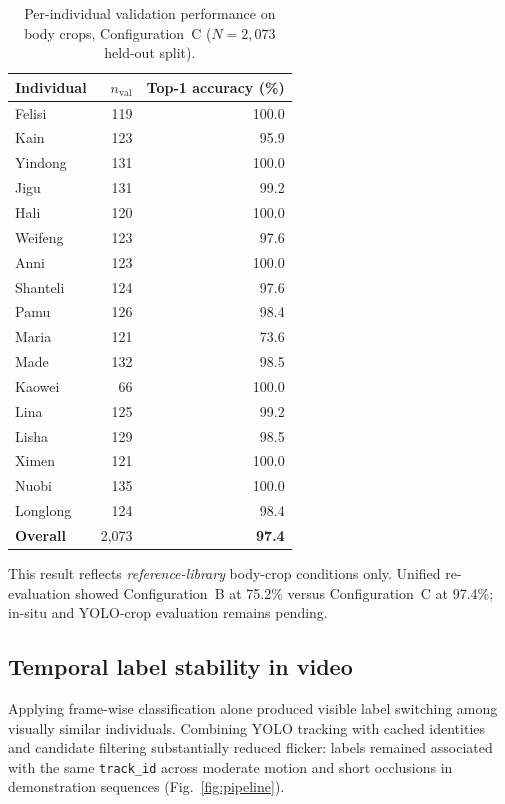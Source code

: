 \documentclass[preprint,12pt,3p,times]{elsarticle}
\begin{document}
\begin{table}[t]
  \centering
  \caption{Per-individual validation performance on body crops, Configuration~C ($N{=}2{,}073$ held-out split).}
  \label{tab:placeholder}
  \begin{tabular}{@{}lrr@{}}
    \toprule
    Individual & $n_{\mathrm{val}}$ & Top-1 accuracy (\%) \\
    \midrule
    Felisi & 119 & 100.0 \\
    Kain & 123 & 95.9 \\
    Yindong & 131 & 100.0 \\
    Jigu & 131 & 99.2 \\
    Hali & 120 & 100.0 \\
    Weifeng & 123 & 97.6 \\
    Anni & 123 & 100.0 \\
    Shanteli & 124 & 97.6 \\
    Pamu & 126 & 98.4 \\
    Maria & 121 & 73.6 \\
    Made & 132 & 98.5 \\
    Kaowei & 66 & 100.0 \\
    Lina & 125 & 99.2 \\
    Lisha & 129 & 98.5 \\
    Ximen & 121 & 100.0 \\
    Nuobi & 135 & 100.0 \\
    Longlong & 124 & 98.4 \\
    \midrule
    \textbf{Overall} & 2{,}073 & \textbf{97.4} \\
    \bottomrule
  \end{tabular}
\end{table}

This result reflects \emph{reference-library} body-crop conditions only. Unified re-evaluation showed Configuration~B at 75.2\% versus Configuration~C at 97.4\%; in-situ and YOLO-crop evaluation remains pending.

\subsection{Temporal label stability in video}

Applying frame-wise classification alone produced visible label switching among visually similar individuals. Combining YOLO tracking with cached identities and candidate filtering substantially reduced flicker: labels remained associated with the same \texttt{track\_id} across moderate motion and short occlusions in demonstration sequences (Fig.~\ref{fig:pipeline}).
\end{document}
